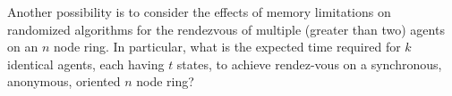 \documentclass[acmtoalg]{acmtrans2m}
\begin{document}
Another possibility is to consider the effects of memory limitations on
randomized algorithms for the rendezvous of multiple (greater than two)
agents on an $n$ node ring.  In particular, what is the expected time
required for $k$ identical agents, each having $t$ states, to achieve
rendez-vous on a synchronous, anonymous, oriented $n$ node ring?






\end{document}
